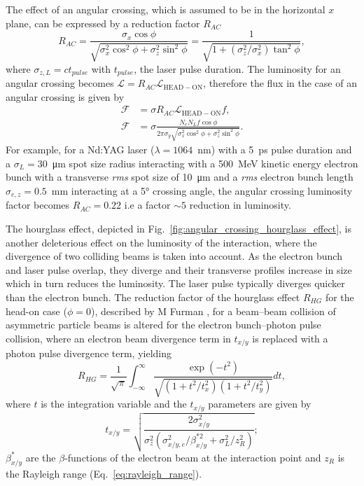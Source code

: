 \documentclass[../main.tex]{subfiles}
\begin{document}
The effect of an angular crossing, which is assumed to be in the horizontal $x$ plane, can be expressed by a reduction factor $R_{AC}$ \cite{suzuki1976general,miyahara2008luminosity}
\begin{equation}
R_{AC} = \frac{\sigma_{x}\cos\phi}{\sqrt{\sigma_{x}^{2}\cos^{2}\phi+\sigma_{z}^{2}\sin^{2}\phi}} = \frac{1}{\sqrt{1+\left(\sigma_{z}^{2}/\sigma_{x}^{2}\right)\tan^{2}\phi}},
\label{eq:angular_crossing_factor}    
\end{equation}
where $\sigma_{z,L} = ct_{pulse}$ with $t_{pulse}$, the laser pulse duration. The luminosity for an angular crossing becomes $\mathcal{L} = R_{AC}\mathcal{L}_{\mathrm{HEAD-ON}}$, therefore the flux in the case of an angular crossing is given by 
\begin{align}
\mathcal{F} &= \sigma R_{AC}\mathcal{L}_{\mathrm{HEAD-ON}}f, \nonumber\\
\mathcal{F} &= \sigma\frac{N_{e}N_{L}f\cos\phi}{2\pi\sigma_{y}\sqrt{\sigma_{x}^{2}\cos^{2}\phi + \sigma_{z}^{2}\sin^{2}\phi}}.
\label{eq:crossing_angle_flux}    
\end{align}
For example, for a Nd:YAG laser ($\lambda = 1064$~\si{\nano\meter}) with a 5~\si{\pico\second} pulse duration and a $\sigma_{L} = 30$~\si{\micro\meter} spot size radius interacting with a 500~\si{\mega\electronvolt} kinetic energy electron bunch with a transverse \textit{rms} spot size of 10~\si{\micro\meter} and a \textit{rms} electron bunch length $\sigma_{e,z} = 0.5$~\si{\milli\meter} interacting at a 5\si{\degree} crossing angle, the angular crossing luminosity factor becomes $R_{AC} = 0.22$ i.e a factor $\sim5$ reduction in luminosity.

The hourglass effect, depicted in Fig.~\ref{fig:angular_crossing_hourglass_effect}, is another deleterious effect on the luminosity of the interaction, where the divergence of two colliding beams is taken into account. As the electron bunch and laser pulse overlap, they diverge and their transverse profiles increase in size which in turn reduces the luminosity. The laser pulse typically diverges quicker than the electron bunch. The reduction factor of the hourglass effect $R_{HG}$ for the head-on case ($\phi = 0$), described by M Furman \cite{furman1991hourglass}, for a beam--beam collision of asymmetric particle beams is altered for the electron bunch--photon pulse collision, where an electron beam divergence term in $t_{x/y}$ is replaced with a photon pulse divergence term, yielding
\begin{equation}
R_{HG} = \frac{1}{\sqrt{\pi}}\int_{-\infty}^{\infty}\frac{\exp\left(-t^{2}\right)}{\sqrt{\left(1+t^{2}/t_{x}^{2}\right)\left(1+t^{2}/t_{y}^{2}\right)}}dt,
\label{eq:furman_hourglass_reduction}    
\end{equation}
where $t$ is the integration variable and the $t_{x/y}$ parameters are given by
\begin{equation}
t_{x/y} = \sqrt{\frac{2\sigma_{x/y}^{2}}{\sigma_{z}^{2}\left(\sigma_{x/y,e}^{2}/\beta_{x/y}^{*2}+\sigma_{L}^{2}/z_{R}^{2}\right)}};
\label{eq:furman_txy_parameters}    
\end{equation}
$\beta_{x/y}^{*}$ are the $\beta$-functions of the electron beam at the interaction point and $z_{R}$ is the Rayleigh range (Eq.~\ref{eq:rayleigh_range}).
\end{document}
